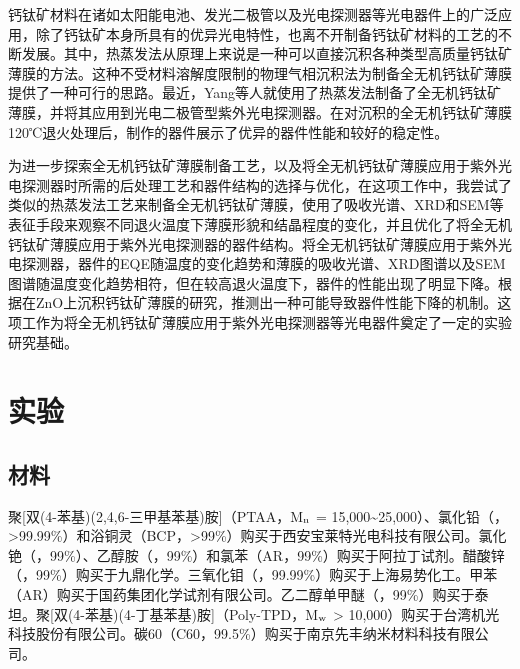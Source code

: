\documentclass[forlib]{WHUMaster}   %
\begin{document}
{钙钛矿材料在诸如太阳能电池、发光二极管以及光电探测器等光电器件上的广泛应用，除了钙钛矿本身所具有的优异光电特性，也离不开制备钙钛矿材料的工艺的不断发展。其中，热蒸发法从原理上来说是一种可以直接沉积各种类型高质量钙钛矿薄膜的方法。这种不受材料溶解度限制的物理气相沉积法为制备全无机钙钛矿薄膜提供了一种可行的思路。最近，Yang等人就使用了热蒸发法制备了全无机钙钛矿薄膜，并将其应用到光电二极管型紫外光电探测器\cite{RN90}。在对沉积的全无机钙钛矿薄膜120℃退火处理后，制作的器件展示了优异的器件性能和较好的稳定性。

为进一步探索全无机钙钛矿薄膜制备工艺，以及将全无机钙钛矿薄膜应用于紫外光电探测器时所需的后处理工艺和器件结构的选择与优化，在这项工作中，我尝试了类似的热蒸发法工艺来制备全无机钙钛矿薄膜，使用了吸收光谱、XRD和SEM等表征手段来观察不同退火温度下薄膜形貌和结晶程度的变化，并且优化了将全无机钙钛矿薄膜应用于紫外光电探测器的器件结构。将全无机钙钛矿薄膜应用于紫外光电探测器，器件的EQE随温度的变化趋势和薄膜的吸收光谱、XRD图谱以及SEM图谱随温度变化趋势相符，但在较高退火温度下，器件的性能出现了明显下降。根据在ZnO上沉积钙钛矿薄膜的研究，推测出一种可能导致器件性能下降的机制。这项工作为将全无机钙钛矿薄膜应用于紫外光电探测器等光电器件奠定了一定的实验研究基础。%

\section{实验}

\subsection{材料}

聚[双(4-苯基)(2,4,6-三甲基苯基)胺]（PTAA，M$_{\rm{n}}$ = 15,000\textasciitilde  25,000）、氯化铅（，>99.99\%）和浴铜灵（BCP，>99\%）购买于西安宝莱特光电科技有限公司。氯化铯（，99\%）、乙醇胺（，99\%）和氯苯（AR，99\%）购买于阿拉丁试剂。醋酸锌（，99\%）购买于九鼎化学。三氧化钼（，99.99\%）购买于上海易势化工。甲苯（AR）购买于国药集团化学试剂有限公司。乙二醇单甲醚（，99\%）购买于泰坦。聚[双(4-苯基)(4-丁基苯基)胺]（Poly-TPD，M$_{\rm{w}}$ > 10,000）购买于台湾机光科技股份有限公司。碳60（C60，99.5\%）购买于南京先丰纳米材料科技有限公司。

}
\end{document}
